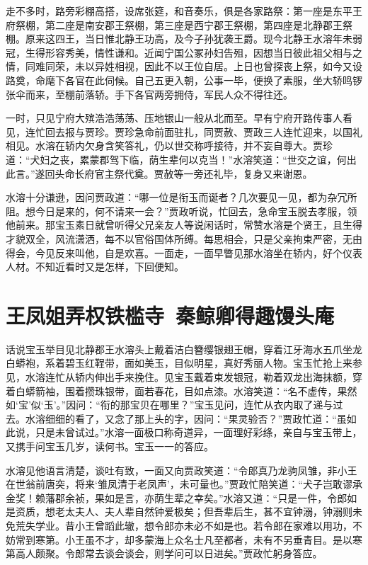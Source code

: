 \documentclass[12pt,oneside]{book}
\begin{document}
走不多时，路旁彩棚高搭，设席张筵，和音奏乐，俱是各家路祭：第一座是东平王府祭棚，第二座是南安郡王祭棚，第三座是西宁郡王祭棚，第四座是北静郡王祭棚。原来这四王，当日惟北静王功高，及今子孙犹袭王爵。现今北静王水溶年未弱冠，生得形容秀美，情性谦和。近闻宁国公冢孙妇告殂，因想当日彼此祖父相与之情，同难同荣，未以异姓相视，因此不以王位自居。上日也曾探丧上祭，如今又设路奠，命麾下各官在此伺候。自己五更入朝，公事一毕，便换了素服，坐大轿鸣锣张伞而来，至棚前落轿。手下各官两旁拥侍，军民人众不得往还。

一时，只见宁府大殡浩浩荡荡、压地银山一般从北而至。早有宁府开路传事人看见，连忙回去报与贾珍。贾珍急命前面驻扎，同贾赦、贾政三人连忙迎来，以国礼相见。水溶在轿内欠身含笑答礼，仍以世交称呼接待，并不妄自尊大。贾珍道：“犬妇之丧，累蒙郡驾下临，荫生辈何以克当！”水溶笑道：“世交之谊，何出此言。”遂回头命长府官主祭代奠。贾赦等一旁还礼毕，复身又来谢恩。

水溶十分谦逊，因问贾政道：“哪一位是衔玉而诞者？几次要见一见，都为杂冗所阻。想今日是来的，何不请来一会？”贾政听说，忙回去，急命宝玉脱去孝服，领他前来。那宝玉素日就曾听得父兄亲友人等说闲话时，常赞水溶是个贤王，且生得才貌双全，风流潇洒，每不以官俗国体所缚。每思相会，只是父亲拘束严密，无由得会，今见反来叫他，自是欢喜。一面走，一面早瞥见那水溶坐在轿内，好个仪表人材。不知近看时又是怎样，下回便知。

 
\chapter{王凤姐弄权铁槛寺~秦鲸卿得趣馒头庵}
话说宝玉举目见北静郡王水溶头上戴着洁白簪缨银翅王帽，穿着江牙海水五爪坐龙白蟒袍，系着碧玉红鞓带，面如美玉，目似明星，真好秀丽人物。宝玉忙抢上来参见，水溶连忙从轿内伸出手来挽住。见宝玉戴着束发银冠，勒着双龙出海抹额，穿着白蟒箭袖，围着攒珠银带，面若春花，目如点漆。水溶笑道：“名不虚传，果然如‘宝’似‘玉’。”因问：“衔的那宝贝在哪里？”宝玉见问，连忙从衣内取了递与过去。水溶细细的看了，又念了那上头的字，因问：“果灵验否？”贾政忙道：“虽如此说，只是未曾试过。”水溶一面极口称奇道异，一面理好彩绦，亲自与宝玉带上，又携手问宝玉几岁，读何书。宝玉一一的答应。

水溶见他语言清楚，谈吐有致，一面又向贾政笑道：“令郎真乃龙驹凤雏，非小王在世翁前唐突，将来‘雏凤清于老凤声’，未可量也。”贾政忙陪笑道：“犬子岂敢谬承金奖！赖藩郡余祯，果如是言，亦荫生辈之幸矣。”水溶又道：“只是一件，令郎如是资质，想老太夫人、夫人辈自然钟爱极矣；但吾辈后生，甚不宜钟溺，钟溺则未免荒失学业。昔小王曾蹈此辙，想令郎亦未必不如是也。若令郎在家难以用功，不妨常到寒第。小王虽不才，却多蒙海上众名士凡至都者，未有不另垂青目。是以寒第高人颇聚。令郎常去谈会谈会，则学问可以日进矣。”贾政忙躬身答应。
\end{document}

